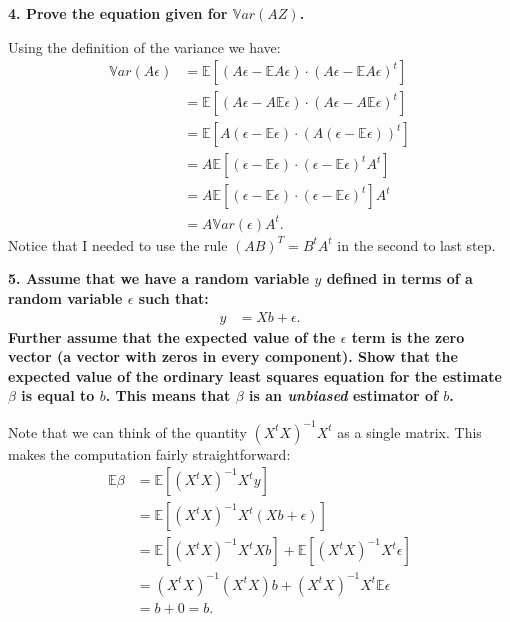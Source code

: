 \documentclass[12pt,hidelinks]{article}
\numberwithin{equation}{section}
\begin{document}
\vspace*{12pt}

\textbf{4. Prove the equation given for $\mathbb{V}ar(AZ)$.}

\vspace*{12pt}

Using the definition of the variance we have:
\begin{align}
\mathbb{V}ar(A\epsilon) &= \mathbb{E} \left[ \left(A\epsilon - \mathbb{E} A\epsilon \right)
\cdot \left(A\epsilon - \mathbb{E} A\epsilon \right)^t \right] \\
 &= \mathbb{E} \left[ \left(A\epsilon - A\mathbb{E} \epsilon \right)
\cdot \left(A\epsilon - A\mathbb{E} \epsilon \right)^t \right] \\
 &= \mathbb{E} \left[ A \left(\epsilon - \mathbb{E} \epsilon \right)
\cdot \left(A \left(\epsilon - \mathbb{E} \epsilon\right) \right)^t \right] \\
 &= A \mathbb{E} \left[\left(\epsilon - \mathbb{E} \epsilon \right)
\cdot \left(\epsilon - \mathbb{E} \epsilon\right)^t A^t \right] \\
&= A \mathbb{E} \left[\left(\epsilon - \mathbb{E} \epsilon \right)
\cdot \left(\epsilon - \mathbb{E} \epsilon\right)^t \right] A^t \\
&= A  \mathbb{V}ar(\epsilon) A^t.
\end{align}
Notice that I needed to use the rule $(AB)^T = B^tA^t$ in the second to last
step.

\vspace*{12pt}

\textbf{5. Assume that we have a random variable $y$ defined in terms of a random
variable $\epsilon$ such that:}
\begin{align}
y &= X b + \epsilon.
\end{align}
\textbf{Further assume that the expected value of the $\epsilon$ term is the zero vector
(a vector with zeros in every component). Show that the expected value of the
ordinary least squares equation for the estimate $\beta$ is equal to $b$.
This means that $\beta$ is an \textit{unbiased} estimator of $b$.}

\vspace*{12pt}

Note that we can think of the quantity $(X^tX)^{-1} X^t$ as a single matrix.
This makes the computation fairly straightforward:
\begin{align}
\mathbb{E} \beta &= \mathbb{E}\left[(X^tX)^{-1} X^t y  \right] \\
&= \mathbb{E}\left[(X^tX)^{-1} X^t (Xb + \epsilon)  \right] \\
&= \mathbb{E}\left[(X^tX)^{-1} X^t Xb \right] + \mathbb{E}\left[(X^tX)^{-1} X^t \epsilon \right] \\
&= (X^tX)^{-1} (X^t X) b + (X^tX)^{-1} X^t \mathbb{E}\epsilon \\
&= b + 0 = b.
\end{align}
\end{document}
